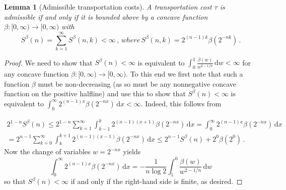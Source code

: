 \documentclass[10pt,a4paper,oneside,final]{article}
\newcommand{\de}{{\mathrm{d}}}
\numberwithin{equation}{section}
\theoremstyle{plain}
\newtheorem{lemma}[theorem]{Lemma}
\theoremstyle{definition}
\theoremstyle{remark}
\begin{document}
\begin{lemma}[Admissible transportation costs]\label{thm:admTau}
A transportation cost $\tau$ is admissible if and only if it is bounded above by a concave function $\beta:[0,\infty)\to[0,\infty)$ with
\begin{equation*}
S^\beta(n) = \sum_{k = 1}^{\infty} S^\beta(n,k) < \infty\,,\,where\,
S^\beta(n,k) = 2^{(n-1)k}\beta\left(2^{-nk}\right)\,.
\end{equation*}
\end{lemma}
\begin{proof}

We need to show that $S^\beta(n)<\infty$ is equivalent to $\int_0^1\frac{\beta(w)}{w^{2-1/n}}\,\de w<\infty$ for any concave function $\beta:[0,\infty)\to[0,\infty)$.
To this end we first note that such a function $\beta$ must be non-decreasing (as so must be any nonnegative concave function on the positive halfline)
and use this to show that $S^\beta(n)<\infty$ is equivalent to $\int_0^\infty2^{(n-1)x}\beta\left(2^{-nx}\right)\,\de x<\infty$.
Indeed, this follows from

\begin{multline*}
2^{1-n}S^\beta(n)
\leq2^{1-n}\sum_{k=1}^{\infty}\int_{k-1}^{k}2^{(n-1)(x+1)}\beta\left(2^{-nx}\right)\,\de x
=\int_0^\infty2^{(n-1)x}\beta\left(2^{-nx}\right)\,\de x\\
=2^{n-1}\sum_{k=0}^{\infty}\int_{k}^{k+1}2^{(n-1)(x-1)}\beta\left(2^{-nx}\right)\,\de x
\leq2^{n-1}S^\beta(n)+2^0\beta(2^0)\,.
\end{multline*}
Now the change of variables $w=2^{-nx}$ yields %
\begin{equation*}
\int_0^\infty2^{(n-1)x}\beta\left(2^{-nx}\right)\,\de x
=-\frac{1}{n\log 2}\int_1^0\frac{\beta(w)}{w^{2-1/n}}\,\de w
\end{equation*}
so that $S^\beta(n)<\infty$ if and only if the right-hand side is finite, as desired.
\end{proof}

\end{document}
